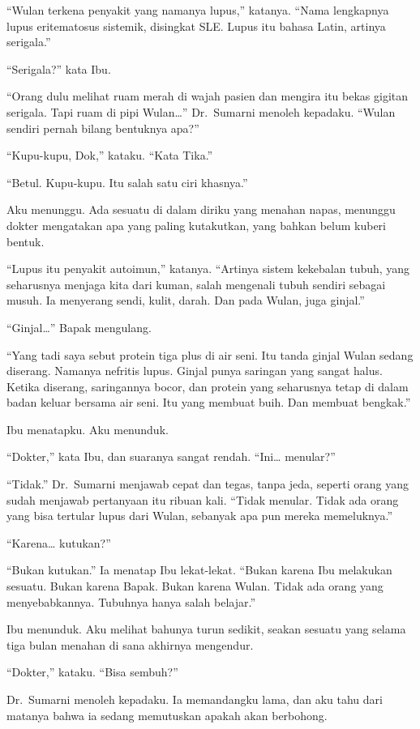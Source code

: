 \documentclass[11pt,twoside,openany]{book}
\begin{document}
``Wulan terkena penyakit yang namanya lupus,'' katanya. ``Nama lengkapnya lupus eritematosus sistemik, disingkat SLE. Lupus itu bahasa Latin, artinya serigala.''

``Serigala?'' kata Ibu.

``Orang dulu melihat ruam merah di wajah pasien dan mengira itu bekas gigitan serigala. Tapi ruam di pipi Wulan\ldots{}'' Dr.~Sumarni menoleh kepadaku. ``Wulan sendiri pernah bilang bentuknya apa?''

``Kupu-kupu, Dok,'' kataku. ``Kata Tika.''

``Betul. Kupu-kupu. Itu salah satu ciri khasnya.''

Aku menunggu. Ada sesuatu di dalam diriku yang menahan napas, menunggu dokter mengatakan apa yang paling kutakutkan, yang bahkan belum kuberi bentuk.

``Lupus itu penyakit autoimun,'' katanya. ``Artinya sistem kekebalan tubuh, yang seharusnya menjaga kita dari kuman, salah mengenali tubuh sendiri sebagai musuh. Ia menyerang sendi, kulit, darah. Dan pada Wulan, juga ginjal.''

``Ginjal\ldots{}'' Bapak mengulang.

``Yang tadi saya sebut protein tiga plus di air seni. Itu tanda ginjal Wulan sedang diserang. Namanya nefritis lupus. Ginjal punya saringan yang sangat halus. Ketika diserang, saringannya bocor, dan protein yang seharusnya tetap di dalam badan keluar bersama air seni. Itu yang membuat buih. Dan membuat bengkak.''

Ibu menatapku. Aku menunduk.

``Dokter,'' kata Ibu, dan suaranya sangat rendah. ``Ini\ldots{} menular?''

``Tidak.'' Dr.~Sumarni menjawab cepat dan tegas, tanpa jeda, seperti orang yang sudah menjawab pertanyaan itu ribuan kali. ``Tidak menular. Tidak ada orang yang bisa tertular lupus dari Wulan, sebanyak apa pun mereka memeluknya.''

``Karena\ldots{} kutukan?''

``Bukan kutukan.'' Ia menatap Ibu lekat-lekat. ``Bukan karena Ibu melakukan sesuatu. Bukan karena Bapak. Bukan karena Wulan. Tidak ada orang yang menyebabkannya. Tubuhnya hanya salah belajar.''

Ibu menunduk. Aku melihat bahunya turun sedikit, seakan sesuatu yang selama tiga bulan menahan di sana akhirnya mengendur.

``Dokter,'' kataku. ``Bisa sembuh?''

Dr.~Sumarni menoleh kepadaku. Ia memandangku lama, dan aku tahu dari matanya bahwa ia sedang memutuskan apakah akan berbohong.
\end{document}
